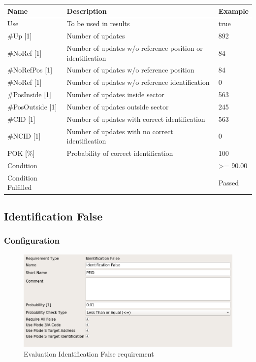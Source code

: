\begin{center}
 \begin{table}[H]
  \begin{tabularx}{\textwidth}{ | l | X |  l | }
    \hline
    \textbf{Name} & \textbf{Description} & \textbf{Example} \\ \hline
    Use & To be used in results & true \\ \hline
    \#Up [1] & Number of updates & 892 \\ \hline
    \#NoRef [1] & Number of updates w/o reference position or identification & 84 \\ \hline
    \#NoRefPos [1] & Number of updates w/o reference position  & 84 \\ \hline
    \#NoRef [1] & Number of updates w/o reference identification & 0 \\ \hline
    \#PosInside [1] & Number of updates inside sector & 563 \\ \hline
    \#PosOutside [1] & Number of updates outside sector & 245 \\ \hline
    \#CID [1] & Number of updates with correct identification & 563 \\ \hline
    \#NCID [1] & Number of updates with no correct identification & 0 \\ \hline
    POK [\%] & Probability of correct identification & 100 \\ \hline
    Condition &  & >= 90.00 \\ \hline
    Condition Fulfilled &  & Passed \\ \hline
\end{tabularx}
\end{table}
\end{center}

\subsection{Identification False}
\label{sec:eval_req_id_false} 

\subsubsection{Configuration}

\begin{figure}[H]
    \includegraphics[width=14cm,frame]{figures/eval_req_id_false.png}
  \caption{Evaluation Identification False requirement}
\end{figure}

